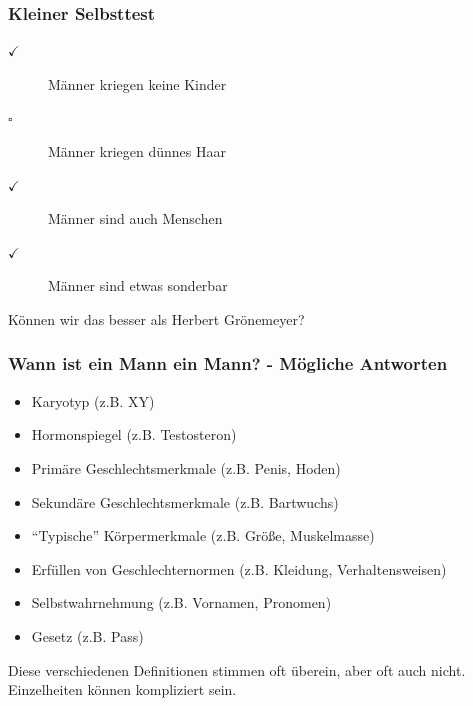 \documentclass{beamer}
\begin{document}
\begin{frame}

\frametitle{Kleiner Selbsttest}


\begin{description}
\item[$\checkmark$]
 Männer kriegen keine Kinder
\item[$\square$]
Männer kriegen dünnes Haar
\item[$\checkmark$]
 Männer sind auch Menschen
\item[$\checkmark$]
 Männer sind etwas sonderbar \\[1cm]
\end{description}

\pause

Können wir das besser als Herbert Grönemeyer?

\end{frame}



\begin{frame}
\frametitle{Wann ist ein Mann ein Mann? - Mögliche Antworten}
\pause

\begin{itemize}
\item
Karyotyp (z.B. XY)
\item
Hormonspiegel (z.B. Testosteron)
\item
Primäre Geschlechtsmerkmale (z.B. Penis, Hoden)
\item
Sekundäre Geschlechtsmerkmale (z.B. Bartwuchs)
\item
``Typische'' Körpermerkmale (z.B. Größe, Muskelmasse)
\item
Erfüllen von Geschlechternormen (z.B. Kleidung, Verhaltensweisen)
\item
Selbstwahrnehmung (z.B. Vornamen, Pronomen)
\item
Gesetz (z.B.  Pass)
\end{itemize}

\pause

Diese verschiedenen Definitionen stimmen oft überein, aber oft auch nicht. Einzelheiten können kompliziert sein.

\end{frame}
\end{document}
